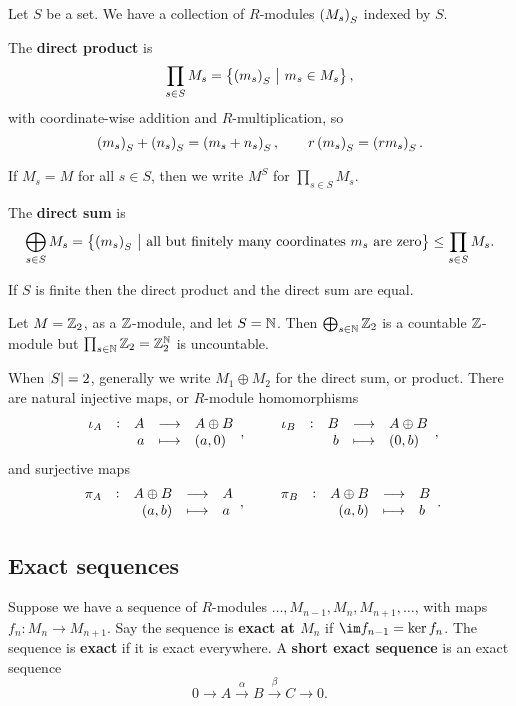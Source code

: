 Let $ S $ be a set. We have a collection of $ R $-modules $ \br{M_s}_S $ indexed by $ S $.

\begin{definition}
The \textbf{direct product} is
$$ \prod_{s \in S} M_s = \cbr{\br{m_s}_S \st m_s \in M_s}, $$
with coordinate-wise addition and $ R $-multiplication, so
$$ \br{m_s}_S + \br{n_s}_S = \br{m_s + n_s}_S, \qquad r\br{m_s}_S = \br{rm_s}_S. $$
\end{definition}

If $ M_s = M $ for all $ s \in S $, then we write $ M^S $ for $ \prod_{s \in S} M_s $.

\begin{definition}
The \textbf{direct sum} is
$$ \bigoplus_{s \in S} M_s = \cbr{\br{m_s}_S \st \text{all but finitely many coordinates} \ m_s \ \text{are zero}} \le \prod_{s \in S} M_s. $$
\end{definition}

If $ S $ is finite then the direct product and the direct sum are equal.

\begin{example*}
Let $ M = \mathbb{Z}_2 $, as a $ \mathbb{Z} $-module, and let $ S = \mathbb{N} $. Then $ \bigoplus_{s \in \mathbb{N}} \mathbb{Z}_2 $ is a countable $ \mathbb{Z} $-module but $ \prod_{s \in \mathbb{N}} \mathbb{Z}_2 = \mathbb{Z}_2^{\mathbb{N}} $ is uncountable.
\end{example*}

When $ \abs{S} = 2 $, generally we write $ M_1 \oplus M_2 $ for the direct sum, or product. There are natural injective maps, or $ R $-module homomorphisms
$$ \function[\iota_A]{A}{A \oplus B}{a}{\br{a, 0}}, \qquad \function[\iota_B]{B}{A \oplus B}{b}{\br{0, b}}, $$
and surjective maps
$$ \function[\pi_A]{A \oplus B}{A}{\br{a, b}}{a}, \qquad \function[\pi_B]{A \oplus B}{B}{\br{a, b}}{b}. $$

\subsection{Exact sequences}

\begin{definition}
Suppose we have a sequence of $ R $-modules $ \dots, M_{n - 1}, M_n, M_{n + 1}, \dots $, with maps $ f_n : M_n \to M_{n + 1} $. Say the sequence is \textbf{exact at $ M_n $} if $ \im f_{n - 1} = \ker f_n $. The sequence is \textbf{exact} if it is exact everywhere. A \textbf{short exact sequence} is an exact sequence
$$ 0 \to A \xrightarrow{\alpha} B \xrightarrow{\beta} C \to 0. $$
\end{definition}

